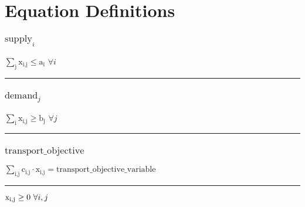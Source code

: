 \documentclass[11pt]{article}
\begin{document}
\section*{Equation Definitions}
\subsubsection*{\begin{math}\text{supply}_{i}\end{math}}
\begin{math}
\displaystyle \sum_{\text{j}} \text{x}_{\text{i},\text{j}} \leq \text{a}_{\text{i}}
\end{math}
\hfill
\begin{math}
\forall i
\end{math}\vspace{5pt}
\hrule
\subsubsection*{\begin{math}\text{demand}_{j}\end{math}}
\begin{math}
\displaystyle \sum_{\text{i}} \text{x}_{\text{i},\text{j}} \geq \text{b}_{\text{j}}
\end{math}
\hfill
\begin{math}
\forall j
\end{math}\vspace{5pt}
\hrule
\subsubsection*{\begin{math}\text{transport\_objective}\end{math}}
\begin{math}
\displaystyle \sum_{\text{i},\text{j}} \text{c}_{\text{i},\text{j}} \cdot \text{x}_{\text{i},\text{j}} = \text{transport\_objective\_variable}
\end{math}
\vspace{5pt}
\hrule
\bigskip
\begin{math}\text{x}_{\text{i},\text{j}}\geq 0 ~ \forall i,j\\\end{math}
\end{document}
